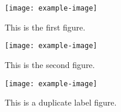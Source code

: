 \documentclass{article}
\begin{document}
\begin{figure}
    \centering
    \texttt{[image: example-image]}
    \caption{This is the first figure.}
    \label{fig:first}
\end{figure}

\begin{figure}
    \centering
    \texttt{[image: example-image]}
    \caption{This is the second figure.}
    \label{fig:second}
\end{figure}

\begin{figure}
    \centering
    \texttt{[image: example-image]}
    \caption{This is a duplicate label figure.}
    \label{fig:first}
\end{figure}
\end{document}
